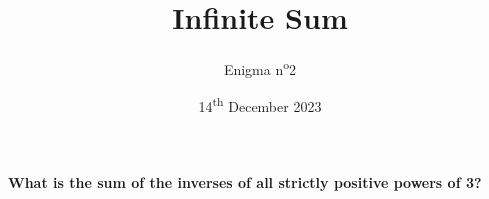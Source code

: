 \documentclass[a4paper, top=10mm]{article}
\title{\textbf{\huge{Infinite Sum}}}
\author{Enigma n\textsuperscript{o}2}
\date{14\textsuperscript{th} December 2023}
\begin{document}
	\maketitle
	
	\vspace{3cm}
	
	\Huge{\textbf{What is the sum of the inverses of all strictly positive powers of 3?}}
	
\end{document}
